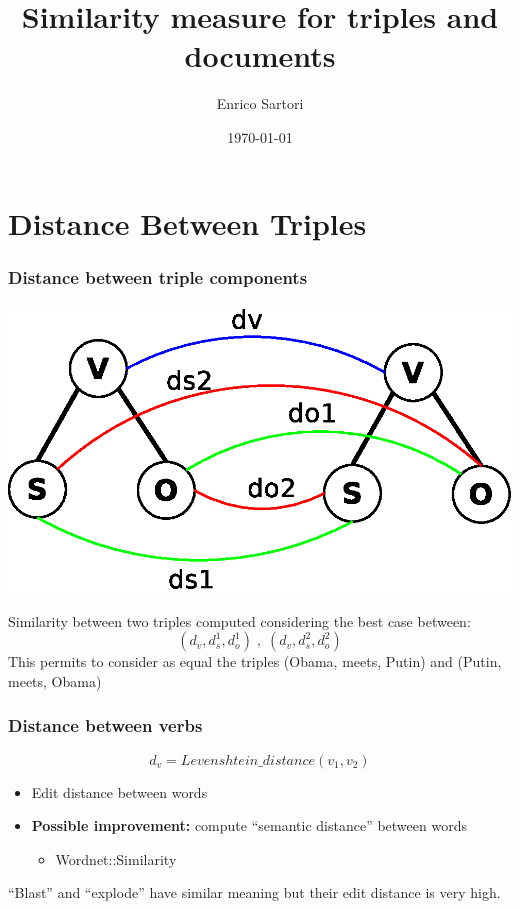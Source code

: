 \documentclass{beamer}
\title{Similarity measure for triples and documents}
\author{Enrico Sartori}
\date{\today}
\begin{document}
\section{Distance Between Triples}
\begin{frame}
\frametitle{Distance between triple components}
\begin{center}
\includegraphics[scale=0.6]{imgs/tri_dist.eps}
\end{center}
Similarity between two triples computed considering the best case between:
$$
(d_{v}, d^{1}_{s}, d^{1}_{o})\;,\;(d_{v}, d^{2}_{s}, d^{2}_{o})
$$
This permits to consider as equal the triples (Obama, meets, Putin)
and (Putin, meets, Obama)
\end{frame}

\begin{frame}
\frametitle{Distance between verbs}
$$
d_{v} = Levenshtein\_distance (v_{1}, v_{2})
$$
\begin{itemize}
\item Edit distance between words
\item {{\bf Possible improvement:}} compute ``semantic distance''
  between words
\begin{itemize}
\item Wordnet::Similarity
\end{itemize}
\end{itemize}
``Blast'' and ``explode'' have similar meaning but their edit distance
is very high.
\end{frame}
\end{document}
